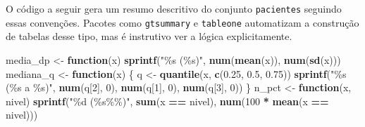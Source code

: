 \documentclass[
]{book}
\newenvironment{Shaded}{\begin{snugshade}}{\end{snugshade}}
\newcommand{\ControlFlowTok}[1]{\textcolor[rgb]{0.13,0.29,0.53}{\textbf{#1}}}
\newcommand{\DecValTok}[1]{\textcolor[rgb]{0.00,0.00,0.81}{#1}}
\newcommand{\FloatTok}[1]{\textcolor[rgb]{0.00,0.00,0.81}{#1}}
\newcommand{\FunctionTok}[1]{\textcolor[rgb]{0.13,0.29,0.53}{\textbf{#1}}}
\newcommand{\NormalTok}[1]{#1}
\newcommand{\OtherTok}[1]{\textcolor[rgb]{0.56,0.35,0.01}{#1}}
\newcommand{\SpecialCharTok}[1]{\textcolor[rgb]{0.81,0.36,0.00}{\textbf{#1}}}
\newcommand{\StringTok}[1]{\textcolor[rgb]{0.31,0.60,0.02}{#1}}
\begin{document}
O código a seguir gera um resumo descritivo do conjunto \texttt{pacientes} seguindo essas convenções. Pacotes como \texttt{gtsummary} e \texttt{tableone} automatizam a construção de tabelas desse tipo, mas é instrutivo ver a lógica explicitamente.

\begin{Shaded}
\begin{Highlighting}[]
\NormalTok{media\_dp }\OtherTok{\textless{}{-}} \ControlFlowTok{function}\NormalTok{(x) }\FunctionTok{sprintf}\NormalTok{(}\StringTok{"\%s (\%s)"}\NormalTok{, }\FunctionTok{num}\NormalTok{(}\FunctionTok{mean}\NormalTok{(x)), }\FunctionTok{num}\NormalTok{(}\FunctionTok{sd}\NormalTok{(x)))}
\NormalTok{mediana\_q }\OtherTok{\textless{}{-}} \ControlFlowTok{function}\NormalTok{(x) \{}
\NormalTok{  q }\OtherTok{\textless{}{-}} \FunctionTok{quantile}\NormalTok{(x, }\FunctionTok{c}\NormalTok{(}\FloatTok{0.25}\NormalTok{, }\FloatTok{0.5}\NormalTok{, }\FloatTok{0.75}\NormalTok{))}
  \FunctionTok{sprintf}\NormalTok{(}\StringTok{"\%s (\%s a \%s)"}\NormalTok{, }\FunctionTok{num}\NormalTok{(q[}\DecValTok{2}\NormalTok{], }\DecValTok{0}\NormalTok{), }\FunctionTok{num}\NormalTok{(q[}\DecValTok{1}\NormalTok{], }\DecValTok{0}\NormalTok{), }\FunctionTok{num}\NormalTok{(q[}\DecValTok{3}\NormalTok{], }\DecValTok{0}\NormalTok{))}
\NormalTok{\}}
\NormalTok{n\_pct }\OtherTok{\textless{}{-}} \ControlFlowTok{function}\NormalTok{(x, nivel) }\FunctionTok{sprintf}\NormalTok{(}\StringTok{"\%d (\%s\%\%)"}\NormalTok{, }\FunctionTok{sum}\NormalTok{(x }\SpecialCharTok{==}\NormalTok{ nivel), }\FunctionTok{num}\NormalTok{(}\DecValTok{100} \SpecialCharTok{*} \FunctionTok{mean}\NormalTok{(x }\SpecialCharTok{==}\NormalTok{ nivel)))}


\end{Highlighting}
\end{Shaded}
\end{document}
